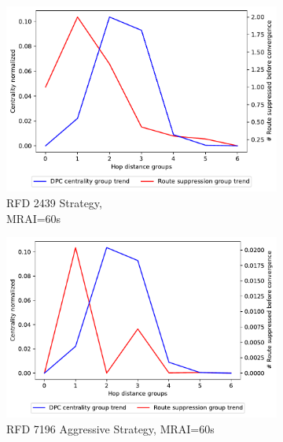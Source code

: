 \begin{figure}[H]
\begin{subfigure}[b]{0.325\textwidth}
         \includegraphics[width=\textwidth]{images/RFD/miceVSelephants/MultiMRAI/60/mice/cisco_1000_RFD_nodeConvergence_centVSsup_trend.pdf}
         \caption{RFD 2439 Strategy, \\MRAI=60s}
         \label{fig:1000_2439RFD_centVSsup_mices}
     \end{subfigure}
     \hfill
     \begin{subfigure}[b]{0.325\textwidth}
         \centering
         \includegraphics[width=\textwidth]{images/RFD/miceVSelephants/MultiMRAI/60/mice/cisco_1000_RFD_7196_aggressive_nodeConvergence_centVSsup_trend.pdf}
         \caption{RFD 7196 Aggressive Strategy, MRAI=60s}
         \label{fig:1000_7196RFDA_centVSsup_mices}
     \end{subfigure}
     \hfill
     \begin{subfigure}[b]{0.325\textwidth}
         \centering

\end{subfigure}
\end{figure}
